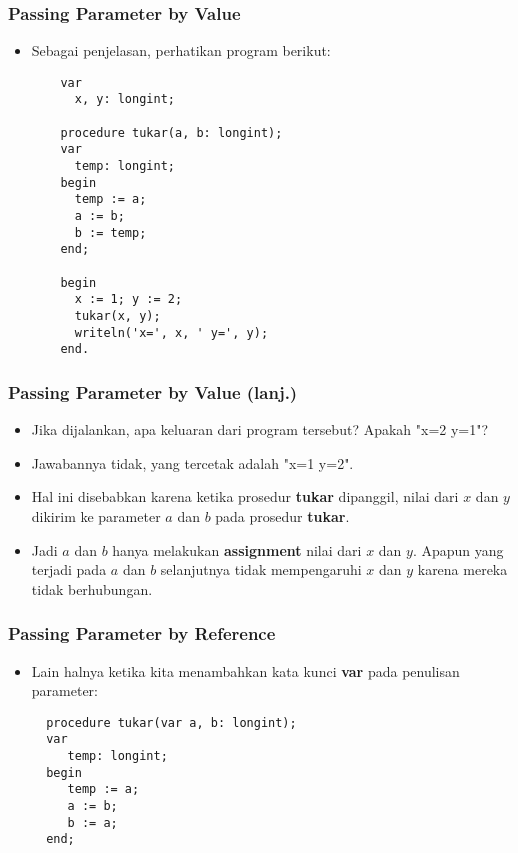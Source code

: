 \begin{frame}[fragile]
\frametitle{Passing Parameter by Value}
\begin{itemize}
  \item Sebagai penjelasan, perhatikan program berikut:
  \begin{lstlisting}
    var
      x, y: longint;

    procedure tukar(a, b: longint);
    var
      temp: longint;
    begin
      temp := a;
      a := b;
      b := temp;
    end;

    begin
      x := 1; y := 2;
      tukar(x, y);
      writeln('x=', x, ' y=', y);
    end.
  \end{lstlisting}
\end{itemize}
\end{frame}

\begin{frame}[fragile]
\frametitle{Passing Parameter by Value (lanj.)}
\begin{itemize}
  \item Jika dijalankan, apa keluaran dari program tersebut? Apakah "x=2 y=1"?
  \item Jawabannya \alert{tidak}, yang tercetak adalah "x=1 y=2".
  \item Hal ini disebabkan karena ketika prosedur \textbf{tukar} dipanggil, \alert{nilai} dari $x$ dan $y$ dikirim ke parameter $a$ dan $b$ pada prosedur \textbf{tukar}.
  \item Jadi $a$ dan $b$ hanya melakukan \textbf{assignment} nilai dari $x$ dan $y$. Apapun yang terjadi pada $a$ dan $b$ selanjutnya tidak mempengaruhi $x$ dan $y$ karena mereka \alert{tidak berhubungan}.
\end{itemize}
\end{frame}

\begin{frame}[fragile]
\frametitle{Passing Parameter by Reference}
\begin{itemize}
  \item Lain halnya ketika kita menambahkan kata kunci \textbf{var} pada penulisan parameter:
  \begin{lstlisting}
  procedure tukar(var a, b: longint);
  var
     temp: longint;
  begin
     temp := a;
     a := b;
     b := a;
  end;
  \end{lstlisting}
\end{itemize}
\end{frame}

